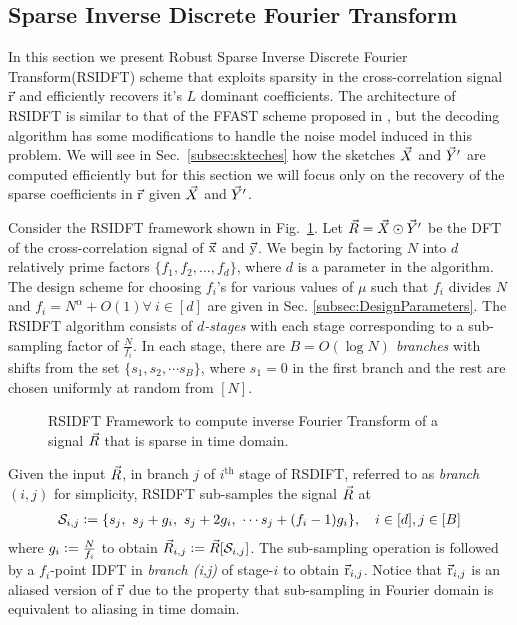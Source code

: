 \subsection{Sparse Inverse Discrete Fourier Transform}
\label{subsec:RSIDFT}	
 In this section we present Robust Sparse Inverse Discrete Fourier Transform(RSIDFT) scheme that exploits sparsity in the cross-correlation signal $\vec{\mathrm{r}}$ and efficiently recovers it's $L$ dominant coefficients. The architecture of RSIDFT is similar to that of the FFAST scheme proposed in \cite{pawar2014robust}, but the decoding algorithm has some modifications to handle the noise model induced in this problem. We will see in Sec.~\ref{subsec:skteches} how the sketches $\vec{X}$ and $\vec{Y}'$ are computed efficiently but for this section we will focus only on the recovery of the sparse coefficients in $\vec{\mathrm{r}}$ given $\vec{X}$ and $\vec{Y}'$.
	  	
Consider the RSIDFT framework shown in Fig.~\ref{fig:rsidft}. Let $ \vec{R} =\vec{X} \odot \vec{Y}'$ be the DFT of the cross-correlation signal of $\vec{\mathrm{x}}$ and $\vec{\mathrm{y}}$. We begin by factoring $N$ into $d$ relatively prime factors $\{f_1,f_2,\ldots,f_d\}$, where $d$ is a parameter in the algorithm. The design scheme for choosing $f_i$'s for various values of $\mu$ such that $f_i$ divides $N$ and $f_i=N^{\alpha}+O(1) \forall ~i\in[d]$ are given in Sec. \ref{subsec:DesignParameters}. The RSIDFT algorithm consists of {\it $d$-stages} with each stage corresponding to a sub-sampling factor of $\frac{N}{f_i}$. In each stage, there are {\it $B= O(\log N)$ branches} with shifts from the set $ \{s_1, s_2, \cdots s_B\} $, where $s_1 =0$ in the first branch and the rest are chosen uniformly at random from $[N]$.
	   	 	
\begin{figure}[h!]
	\begin{center}
	 	\resizebox{0.45\textwidth}{!}{}
	\end{center}	
\caption{ RSIDFT Framework to compute inverse Fourier Transform of a signal $\vec{R}$ that is sparse in time domain. }\label{fig:rsidft}
\end{figure}

	 Given the input $\vec{R}$, in branch $j$ of $i^{\text{th}}$ stage of RSDIFT, referred to as \textit{branch $(i,j)$} for simplicity, RSIDFT sub-samples the signal $\vec{R}$ at
\begin{align}
\label{Eqn:SamplingSets}
	 \mathcal{S}_{i,j} \mathrel{\mathop:}= \{s_j,\ s_j + g_i,\ s_j + 2g_i,\ \cdots s_j + (f_i-1) g_i\}, \quad i\in[d], j\in[B]
\end{align}
where $g_i\mathrel{\mathop:}= \frac{N}{f_i}$ to obtain $\vec{R}_{i,j}\mathrel{\mathop:}=\vec{R}[\mathcal{S}_{i,j}]$. The sub-sampling operation is followed by a $f_i$-point IDFT in \textit{branch (i,j)} of stage-$i$ to obtain $ \vec{\mathrm{r}}_{i,j}$. Notice that $ \vec{\mathrm{r}}_{i,j}$ is an aliased version of $\vec{\mathrm{r}}$ due to the property that sub-sampling in Fourier domain is equivalent to aliasing in time domain.

